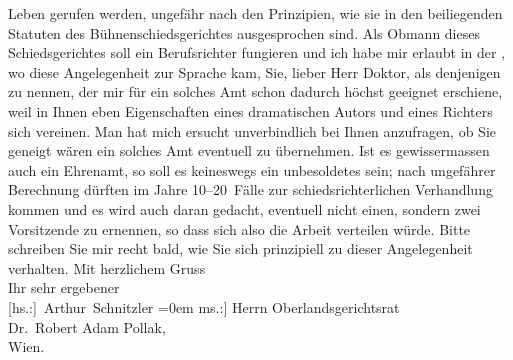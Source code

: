 \begin{ledgroupsized}[t]{13cm}
                    Leben gerufen werden, ungefähr nach den Prinzipien, wie sie in den beiliegenden
                    Statuten des Bühnenschiedsgerichtes ausgesprochen sind. Als Obmann dieses
                    Schiedsgerichtes soll ein Berufsrichter fungieren und ich habe mir erlaubt in
                    der \label{K_L02356_1v}\label{K_L02356_1h},
                    wo diese Angelegenheit zur Sprache kam, Sie, lieber Herr Doktor, als denjenigen
                    zu nennen, der mir für ein solches Amt schon dadurch höchst geeignet erschiene,
                    weil in Ihnen eben Eigenschaften eines dramatischen Autors und eines Richters
                    sich vereinen. Man hat mich ersucht unverbindlich bei Ihnen anzufragen, ob Sie
                    geneigt wären ein solches Amt eventuell zu übernehmen. Ist es gewissermassen
                    auch ein Ehrenamt, so soll es keineswegs ein unbesoldetes sein; nach ungefährer
                    Berechnung dürften im Jahre 10–20 Fälle zur schiedsrichterlichen Verhandlung
                    kommen und es wird auch daran gedacht, eventuell nicht einen, sondern zwei
                    Vorsitzende zu ernennen, so dass sich also die Arbeit verteilen würde. Bitte
                    schreiben Sie mir recht bald, wie Sie sich prinzipiell zu dieser Angelegenheit
                    verhalten.\pend
           \pstart
           Mit herzlichem Gruss{\\[\baselineskip]}Ihr sehr ergebener{\\[\baselineskip]}\spacefill\mbox{{[}hs.:{]} Arthur Schnitzler}\pend
           \leftskip=0em{}\pstart
           \noindent{}{[}ms.:{]} Herrn Oberlandsgerichtsrat{\\}Dr. Robert
                        Adam Pollak,{\\}Wien.\pend
           \endnumbering{}\end{ledgroupsized}  \newcommand{\dateiname}{L02356}\newcommand{\titel}{Arthur Schnitzler an Robert Adam, 28. 10. 1920}\newcommand{\editorInnen}{Martin Anton Müller und Gerd-Hermann Susen}
            \footnotesize
\begin{ledgroupsized}[t]{11.5cm}
\end{ledgroupsized}
         
      
